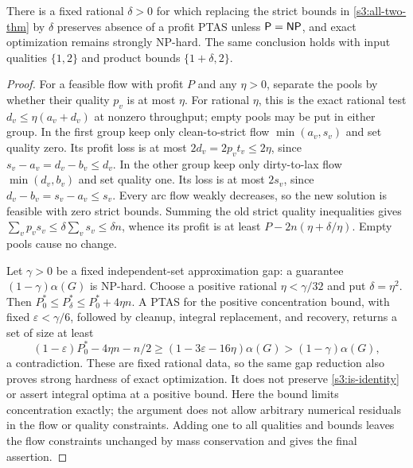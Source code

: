 \begin{proposition}\label{s3:tolerance}
There is a fixed rational $\delta>0$ for which replacing the strict
bounds in \cref{s3:all-two-thm} by $\delta$ preserves absence of a profit
PTAS unless $\mathsf P=\mathsf{NP}$, and exact optimization remains strongly NP-hard.
The same conclusion holds with input qualities $\{1,2\}$ and product
bounds $\{1+\delta,2\}$.
\end{proposition}
\begin{proof}
For a feasible flow with profit $P$ and any $\eta>0$, separate the pools
by whether their quality $p_v$ is at most $\eta$. For rational $\eta$,
this is the exact rational test $d_v\le\eta(a_v+d_v)$ at nonzero
throughput; empty pools may be put in either group. In the first group keep
only clean-to-strict flow $\min(a_v,s_v)$ and set quality zero. Its profit
loss is at most $2d_v=2p_vt_v\le2\eta$, since
$s_v-a_v=d_v-b_v\le d_v$. In the other group keep only dirty-to-lax
flow $\min(d_v,b_v)$ and set quality one. Its loss is at most $2s_v$,
since $d_v-b_v=s_v-a_v\le s_v$. Every arc flow weakly decreases,
so the new solution is feasible with zero strict bounds. Summing the
old strict quality inequalities gives
$\sum_v p_vs_v\le\delta\sum_v s_v\le\delta n$, whence its profit is
at least $P-2n(\eta+\delta/\eta)$. Empty pools cause no change.

Let $\gamma>0$ be a fixed independent-set approximation gap: a guarantee
$(1-\gamma)\alpha(G)$ is NP-hard. Choose a positive rational
$\eta<\gamma/32$ and put $\delta=\eta^2$. Then
$P_0^*\le P_\delta^*\le P_0^*+4\eta n$.
A PTAS for the positive concentration bound, with fixed
$\varepsilon<\gamma/6$, followed
by cleanup, integral replacement, and recovery, returns a set of size
at least
\[
 (1-\varepsilon)P_0^*-4\eta n-n/2
 \ge(1-3\varepsilon-16\eta)\alpha(G)
 >(1-\gamma)\alpha(G),
\]
a contradiction. These are fixed rational data, so the same gap reduction
also proves strong hardness of exact optimization. It does not preserve
\eqref{s3:is-identity} or assert integral optima at a positive bound.
Here the bound limits concentration exactly; the argument does not allow
arbitrary numerical residuals in the flow or quality constraints.
Adding one to all qualities and bounds leaves the flow constraints
unchanged by mass conservation and gives the final assertion.
\end{proof}

